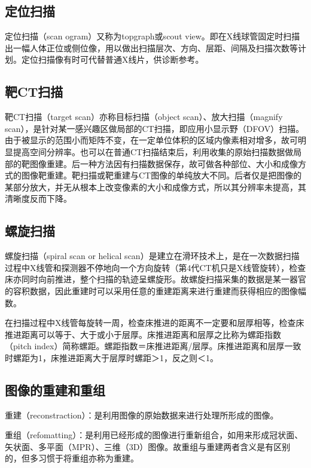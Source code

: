 \subsection{定位扫描}

定位扫描（scan ogram）又称为topgraph或scout
view。即在X线球管固定时扫描出一幅人体正位或侧位像，用以做出扫描层次、方向、层距、间隔及扫描次数等计划。定位扫描像有时可代替普通X线片，供诊断参考。

\subsection{靶CT扫描}

靶CT扫描（target scan）亦称目标扫描（object scan）、放大扫描（magnify
scan），是针对某一感兴趣区做局部的CT扫描，即应用小显示野（DFOV）扫描。由于被显示的范围小而矩阵不变，在一定单位体积的区域内像素相对增多，故可明显提高空间分辨率。也可以在普通CT扫描结束后，利用收集的原始扫描数据做局部的靶图像重建。后一种方法因有扫描数据保存，故可做各种部位、大小和成像方式的图像靶重建。靶扫描或靶重建与CT图像的单纯放大不同。后者仅是把图像的某部分放大，并无从根本上改变像素的大小和成像方式，所以其分辨率未提高，其清晰度反而下降。

\subsection{螺旋扫描}

螺旋扫描（spiral scan or helical
scan）是建立在滑环技术上，是在一次数据扫描过程中X线管和探测器不停地向一个方向旋转（第4代CT机只是X线管旋转），检查床亦同时向前推进，整个扫描的轨迹呈螺旋形。故螺旋扫描采集的数据是某一器官的容积数据，因此重建时可以采用任意的重建距离来进行重建而获得相应的图像幅数。

在扫描过程中X线管每旋转一周，检查床推进的距离不一定要和层厚相等，检查床推进距离可以等于、大于或小于层厚。床推进距离和层厚之比称为螺距指数（pitch
index）简称螺距。螺距指数＝床推进距离/层厚。床推进距离和层厚一致时螺距为1，床推进距离大于层厚时螺距＞1，反之则＜1。

\subsection{图像的重建和重组}

重建（reconstraction）：是利用图像的原始数据来进行处理所形成的图像。

重组（refomatting）：是利用已经形成的图像进行重新组合，如用来形成冠状面、矢状面、多平面（MPR）、三维（3D）图像。故重组与重建两者含义是有区别的，但多习惯于将重组亦称为重建。

